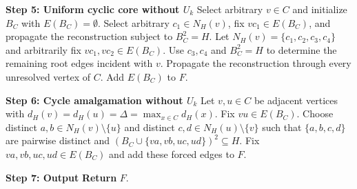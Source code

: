 \documentclass[11pt]{article}
\begin{document}
\begin{algorithm} \ContinuedFloat \caption{Cyclic-Core Root Reconstruction (continued)} \label{algo::cyclic_core_reconstruction_3}
  \begin{algorithmic}[1]


  \Statex \textbf{Step 5: Uniform cyclic core without $U_k$}
      \State Select arbitrary $v\in C$ and initialize $B_C$ with $E(B_C)=\emptyset$.
          \State Select arbitrary $c_1\in N_H(v)$, fix $vc_1\in E(B_C)$, and propagate the reconstruction subject to $B_C^2=H$.
          \State Let $N_H(v)=\{c_1,c_2,c_3,c_4\}$ and arbitrarily fix $vc_1,vc_2\in E(B_C)$.
          \State Use $c_3,c_4$ and $B_C^2=H$ to determine the remaining root edges incident with $v$.
          \State Propagate the reconstruction through every unresolved vertex of $C$.
      \EndIf
      \State Add $E(B_C)$ to $F$.
  \EndIf

  \Statex \textbf{Step 6: Cycle amalgamation without $U_k$}
      \State Let $v,u\in C$ be adjacent vertices with $d_H(v)=d_H(u)=\Delta=\max_{x\in C}d_H(x)$.
      \State Fix $vu\in E(B_C)$.
      \State Choose distinct $a,b\in N_H(v)\setminus\{u\}$ and distinct $c,d\in N_H(u)\setminus\{v\}$ such that $\{a,b,c,d\}$ are pairwise distinct and $(B_C\cup\{va,vb,uc,ud\})^2\subseteq H$.
      \State Fix $va,vb,uc,ud\in E(B_C)$ and add these forced edges to $F$.
  \EndIf

  \Statex \textbf{Step 7: Output}
  \State \textbf{Return} $F$.

  \end{algorithmic}
\end{algorithm}
\end{document}
